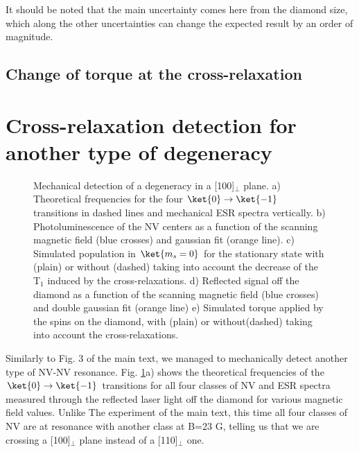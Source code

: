 \documentclass[preprintnumbers,amsmath,amssymb,onecolumn,12pt]{revtex4}
\begin{document}
It should be noted that the main uncertainty comes here from the diamond size, which along the other uncertainties can change the expected result by an order of magnitude.

\subsection{Change of torque at the cross-relaxation}

\section{Cross-relaxation detection for another type of degeneracy}

\begin{figure}[!ht]
  \centering {}
  \caption{Mechanical detection of a degeneracy in a [100]$_\perp$ plane. a) Theoretical frequencies for the four $\ket{0} \to \ket{-1}$ transitions in dashed lines and mechanical ESR spectra vertically. b) Photoluminescence of the NV centers as a function of the scanning magnetic field (blue crosses) and gaussian fit (orange line). c) Simulated population in $\ket{m_s=0}$ for the stationary state with (plain) or without (dashed) taking into account the decrease of the T$_1$ induced by the cross-relaxations.
  d) Reflected signal off the diamond as a function of the scanning magnetic field (blue crosses) and double gaussian fit (orange line) e) Simulated torque applied by the spins on the diamond, with (plain) or without(dashed) taking into account the cross-relaxations.}
	\label{CR_22}
\end{figure}

Similarly to Fig. 3 of the main text, we managed to mechanically detect another type of NV-NV resonance. Fig. \ref{CR_22}a) shows the theoretical frequencies of the $\ket{0} \to \ket{-1}$ transitions for all four classes of NV and ESR spectra measured through the reflected laser light off the diamond for various magnetic field values. Unlike The experiment of the main text, this time all four classes of NV are at resonance with another class at B=23 G, telling us that we are crossing a [100]$_\perp$ plane instead of a [110]$_\perp$ one.
\end{document}
